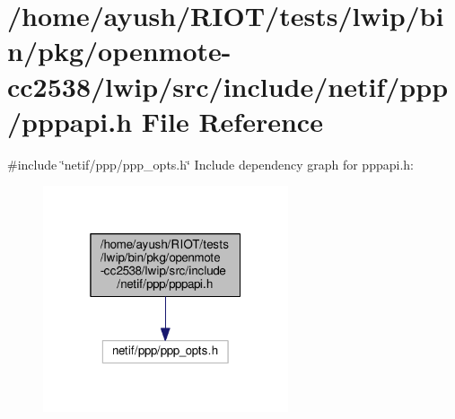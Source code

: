 \hypertarget{openmote-cc2538_2lwip_2src_2include_2netif_2ppp_2pppapi_8h}{}\section{/home/ayush/\+R\+I\+O\+T/tests/lwip/bin/pkg/openmote-\/cc2538/lwip/src/include/netif/ppp/pppapi.h File Reference}
\label{openmote-cc2538_2lwip_2src_2include_2netif_2ppp_2pppapi_8h}
{\ttfamily \#include \char`\"{}netif/ppp/ppp\+\_\+opts.\+h\char`\"{}}\newline
Include dependency graph for pppapi.\+h\+:
\nopagebreak
\begin{figure}[H]
\begin{center}
\leavevmode
\includegraphics[width=205pt]{openmote-cc2538_2lwip_2src_2include_2netif_2ppp_2pppapi_8h__incl}
\end{center}
\end{figure}
